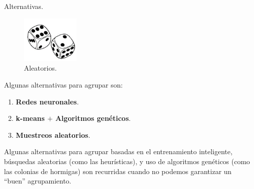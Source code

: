 \begin{frame}[fragile]{Alternativas.}{}
  \begin{figure} %
    \centering
    \includegraphics[width=0.25\textwidth]{./Imagenes/Aleatorios.png}
    \caption*{Aleatorios.}
  \end{figure}
  
  Algunas alternativas para agrupar son:
  \begin{enumerate}
  \item \textbf{Redes neuronales}.
  \item \textbf{k-means $+$ Algoritmos genéticos}.
  \item \textbf{Muestreos aleatorios}.
  \end{enumerate}

  \begin{justify}  
    Algunas alternativas para agrupar basadas en el entrenamiento inteligente,
    búsquedas aleatorias (como las heurísticas), y uso de algoritmos genéticos
    (como las colonias de hormigas) son recurridas cuando no podemos garantizar
    un ``buen'' agrupamiento.
  \end{justify}
  

\end{frame}
